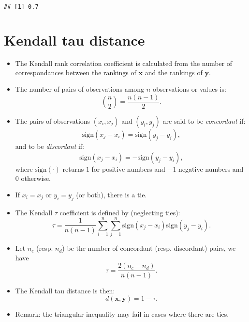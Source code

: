 \documentclass[
]{article}
\newenvironment{Shaded}{\begin{snugshade}}{\end{snugshade}}
\newcommand{\ControlFlowTok}[1]{\textcolor[rgb]{0.13,0.29,0.53}{\textbf{#1}}}
\newcommand{\DecValTok}[1]{\textcolor[rgb]{0.00,0.00,0.81}{#1}}
\newcommand{\KeywordTok}[1]{\textcolor[rgb]{0.13,0.29,0.53}{\textbf{#1}}}
\newcommand{\NormalTok}[1]{#1}
\newcommand{\OperatorTok}[1]{\textcolor[rgb]{0.81,0.36,0.00}{\textbf{#1}}}
\providecommand{\tightlist}{%
  \setlength{\itemsep}{0pt}\setlength{\parskip}{0pt}}
\begin{document}
\begin{verbatim}
## [1] 0.7
\end{verbatim}

\hypertarget{kendall-tau-distance}{%
\section{Kendall tau distance}\label{kendall-tau-distance}}

\begin{itemize}
\tightlist
\item
  The Kendall rank correlation coefficient is calculated from the number
  of correspondances between the rankings of \(\mathbf{x}\) and the
  rankings of \(\mathbf{y}\).
\item
  The number of pairs of observations among \(n\) observations or values
  is: \[{n \choose 2} =\frac{n(n-1)}{2}.\]
\item
  The pairs of observations \((x_{i},x_{j})\) and \((y_{i},y_{j})\) are
  said to be \emph{concordant} if:
  \[\text{sign}(x_j-x_i)=\text{sign}(y_j-y_i),\] and to be
  \emph{discordant} if: \[\text{sign}(x_j-x_i)=-\text{sign}(y_j-y_i),\]
  where \(\text{sign}(\cdot)\) returns \(1\) for positive numbers and
  \(-1\) negative numbers and \(0\) otherwise.
\item
  If \(x_i=x_j\) or \(y_i=y_j\) (or both), there is a tie.
\item
  The Kendall \(\tau\) coefficient is defined by (neglecting ties):
  \[\tau =\frac {1}{n(n-1)}\sum_{i=1}^{n}\sum_{j=1}^n\text{sign}(x_j-x_i)\text{sign}(y_j-y_i).\]
\item
  Let \(n_c\) (resp. \(n_d\)) be the number of concordant (resp.
  discordant) pairs, we have \[\tau =\frac {2(n_c-n_d)}{n(n-1)}.\]
\item
  The Kendall tau distance is then:
  \[d(\mathbf{x},\mathbf{y})=1-\tau. \]
\item
  Remark: the triangular inequality may fail in cases where there are
  ties.
\end{itemize}

\begin{Shaded}
\end{Shaded}
\end{document}
